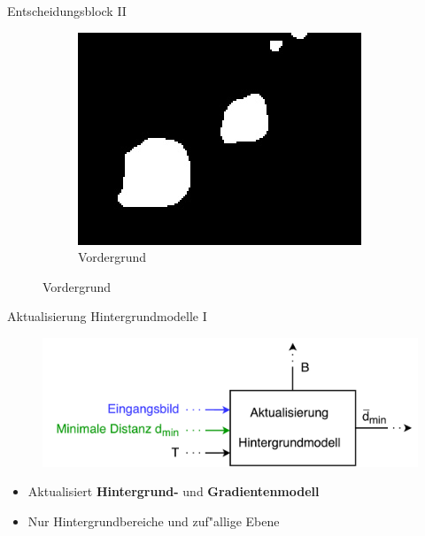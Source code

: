 \documentclass[hyperref={pdfpagelabels=false}]{beamer}
\begin{document}
\begin{frame}{Entscheidungsblock II}
\begin{figure}
		\vspace{5mm}
		\begin{subfigure}{.3\linewidth}
			\centering
			\includegraphics[width=\linewidth]{./Bilder/decision_bilder/foreground}
			\caption{Vordergrund}
		\end{subfigure}
	\end{figure}
\end{frame}

\begin{frame}{Aktualisierung Hintergrundmodelle I}
	\begin{figure}
		\centering
		\includegraphics[width=\linewidth]{./Bilder/PDF/background_update}
	\end{figure}
	\begin{itemize}
		\item Aktualisiert \textbf{Hintergrund-} und \textbf{Gradientenmodell}
		\item Nur Hintergrundbereiche und zuf"allige Ebene
	\end{itemize}
\end{frame}
\end{document}
